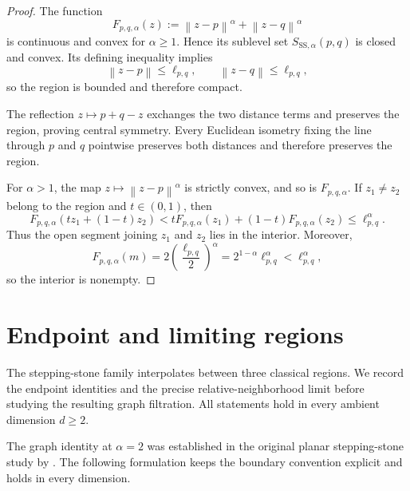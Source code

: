 \documentclass[a4paper,fleqn]{cas-sc}
\theoremstyle{definition}
\theoremstyle{remark}
\newcommand{\norm}[1]{\left\lVert #1\right\rVert}
\newcommand{\ellpq}{\ell_{p,q}}
\newcommand{\0}{\mathbf{0}}
\newcommand{\ttq}[1]{#1}
\newcommand{\ttq}[1]{\textcolor[HTML]{008B8B}{#1}}
\begin{document}
\begin{proof}
The function
\begin{equation}
    F_{p,q,\alpha}(z)
    :=\norm{z-p}^{\alpha}+\norm{z-q}^{\alpha}
\end{equation}
is continuous and convex for $\alpha\geq1$. Hence its sublevel set
$S_{\mathrm{SS},\alpha}(p,q)$ is closed and convex. Its defining inequality
implies
\begin{equation}
    \norm{z-p}\leq\ellpq,
    \qquad
    \norm{z-q}\leq\ellpq,
\end{equation}
so the region is bounded and therefore compact.

The reflection $z\mapsto p+q-z$ exchanges the two distance terms and preserves
the region, proving central symmetry. \ttq{Every Euclidean isometry fixing
the line through $p$ and $q$ pointwise preserves both distances} and
therefore preserves the region.

For $\alpha>1$, the map $z\mapsto\norm{z-p}^{\alpha}$ is strictly convex, and
so is $F_{p,q,\alpha}$. If $z_1\neq z_2$ belong to the region and
$t\in(0,1)$, then
\begin{equation}
    F_{p,q,\alpha}\left(tz_1+(1-t)z_2\right)
    <tF_{p,q,\alpha}(z_1)+(1-t)F_{p,q,\alpha}(z_2)
    \leq\ellpq^{\alpha}.
\end{equation}
Thus the open segment joining $z_1$ and $z_2$ lies in the interior. Moreover,
\begin{equation}
    F_{p,q,\alpha}(m)
    =2\left(\frac{\ellpq}{2}\right)^{\alpha}
    =2^{1-\alpha}\ellpq^{\alpha}
    <\ellpq^{\alpha},
\end{equation}
so the interior is nonempty.
\end{proof}


\section{Endpoint and limiting regions}
\label{sec:boundary-volume}

The stepping-stone family interpolates between three classical regions. We
record the endpoint identities and the precise relative-neighborhood limit
before studying the resulting graph filtration. All statements hold in every
ambient dimension \(d\geq2\).

The graph identity at \(\alpha=2\) was established in the original
planar stepping-stone study by
\citet[Theorem~3.4]{kannangara2018stepping}. The following formulation keeps
the boundary convention explicit and holds in every dimension.
\end{document}
